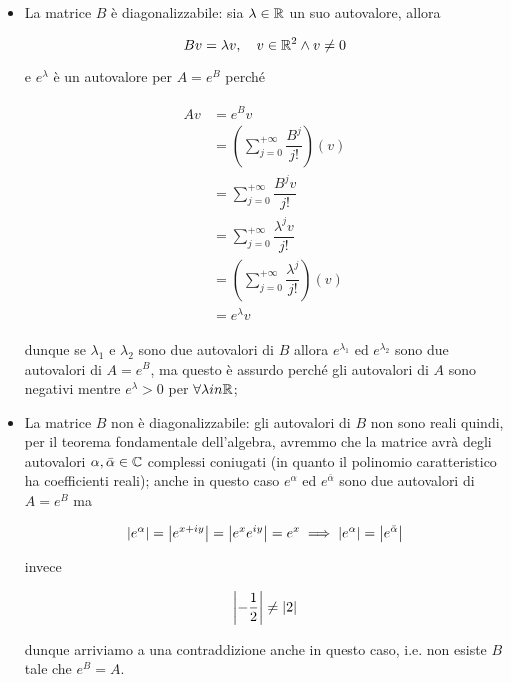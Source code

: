 \begin{itemize}
	\item La matrice $ B $ è diagonalizzabile: sia $ \lambda \in \mathbb{R} $ un suo autovalore, allora
	
	\begin{equation}
		B v = \lambda v \qcomma v \in \R^{2} \wedge v \neq 0
	\end{equation}

	e $ e^{\lambda} $ è un autovalore per $ A = e^{B} $ perché
	
	\begin{align}
		\begin{split}
			A v &= e^{B} v\\
			&= \left( \sum_{j=0}^{+\infty} \dfrac{B^{j}}{j!} \right) (v)\\
			&= \sum_{j=0}^{+\infty} \dfrac{B^{j} v}{j!}\\
			&= \sum_{j=0}^{+\infty} \dfrac{\lambda^{j} v}{j!}\\
			&= \left( \sum_{j=0}^{+\infty} \dfrac{\lambda^{j}}{j!} \right) (v)\\
			&= e^{\lambda} v
		\end{split}
	\end{align}

	dunque se $ \lambda_{1} $ e $ \lambda_{2} $ sono due autovalori di $ B $ allora $ e^{\lambda_{1}} $ ed $ e^{\lambda_{2}} $ sono due autovalori di $ A = e^{B} $, ma questo è assurdo perché gli autovalori di $ A $ sono negativi mentre $ e^{\lambda} > 0 $ per $ \forall \lambda in \mathbb{R} $;
	
	\item La matrice $ B $ non è diagonalizzabile: gli autovalori di $ B $ non sono reali quindi, per il teorema fondamentale dell'algebra, avremmo che la matrice avrà degli autovalori $ \alpha, \bar{\alpha} \in \mathbb{C} $ complessi coniugati (in quanto il polinomio caratteristico ha coefficienti reali); anche in questo caso $ e^{\alpha} $ ed $ e^{\bar{\alpha}} $ sono due autovalori di $ A = e^{B} $ ma
	
	\begin{equation}
		\abs{e^{\alpha}} = \abs{e^{x + i y}} = \abs{e^{x} e^{i y}} = e^{x} %
		\implies%
		\abs{e^{\alpha}} = \abs{e^{\bar{\alpha}}}
	\end{equation}

	invece
	
	\begin{equation}
		\abs{- \dfrac{1}{2}} \neq \abs{2}
	\end{equation}

	dunque arriviamo a una contraddizione anche in questo caso, i.e. non esiste $ B $ tale che $ e^{B} = A $.
\end{itemize}

